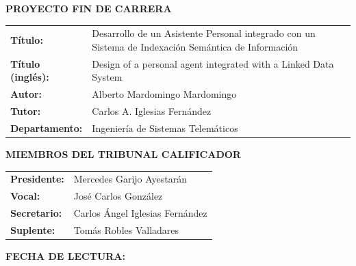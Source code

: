 \cleardoublepage
\thispagestyle{empty}
\vspace*{3\baselineskip}
{\large{\bf PROYECTO FIN DE CARRERA}}
\vspace{0.5cm}

\begin{rm}
\begin{tabular}{p{3cm}p{10cm}}
\textbf{Título:} & Desarrollo de un Asistente Personal integrado con un Sistema de Indexación Semántica de Información\\ 
\textbf{Título (inglés):} & Design of a personal agent integrated with a Linked Data System\\ 
\textbf{Autor:} & Alberto Mardomingo Mardomingo \\ 
\textbf{Tutor:} & Carlos A. Iglesias Fernández\\ 
\textbf{Departamento:} & Ingeniería de Sistemas Telemáticos \\ 
\end{tabular} \end{rm} \vspace{1cm}

{\large{\bf MIEMBROS DEL TRIBUNAL CALIFICADOR}} \vspace{0.5cm}

\begin{rm}
\begin{tabular}{p{3cm}p{10cm}}
\textbf{Presidente:} & Mercedes Garijo Ayestarán\\
\textbf{Vocal:} & José Carlos González\\
\textbf{Secretario:} & Carlos Ángel Iglesias Fernández\\
\textbf{Suplente:} & Tomás Robles Valladares
\end{tabular}
\end{rm}
\vspace{1cm}

{\large{\bf FECHA DE LECTURA:}}
\vspace{1cm}

